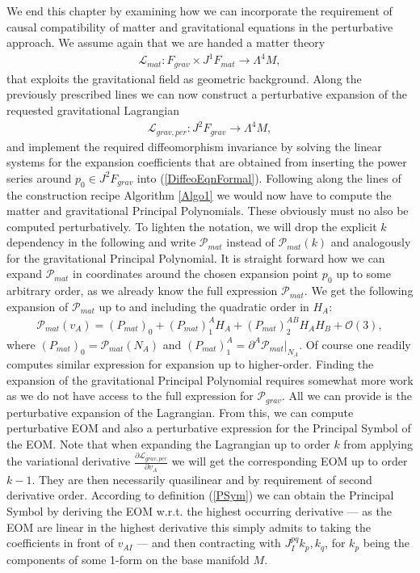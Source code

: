 \documentclass[a4paper,12pt, DIV=14, BCOR=5mm, twoside, headsepline, numbers=noenddot]{scrbook}
\begin{document}
We end this chapter by examining how we can incorporate the requirement of causal compatibility of matter and gravitational equations in the perturbative approach.
We assume again that we are handed a matter theory 
\begin{align}
    \mathcal{L}_{mat} : F_{grav} \times J^1F_{mat} \longrightarrow \Lambda^4M,
\end{align}
that exploits the gravitational field as geometric background. Along the previously prescribed lines we can now construct a perturbative expansion of the requested gravitational Lagrangian
\begin{align}
    \mathcal{L}_{grav,per} : J^2F_{grav} \longrightarrow \Lambda^4M,
\end{align}
and implement the required diffeomorphism invariance by solving the linear systems for the expansion coefficients that are obtained from inserting the power series around $p_0 \in J^2F_{grav}$ into (\ref{DiffeoEqnFormal}). 
Following along the lines of the construction recipe Algorithm \ref{Algo1} we would now have to compute the matter and gravitational Principal Polynomials.
These obviously must no also be computed perturbatively. 
To lighten the notation, we will drop the explicit $k$ dependency in the following and write $\mathcal{P}_{mat}$ instead of $\mathcal{P}_{mat}(k)$ and analogously for the gravitational Principal Polynomial. It is straight forward how we can expand $\mathcal{P}_{mat}$ in coordinates around the chosen expansion point $p_0$ up to some arbitrary order, as we already know the full expression $\mathcal{P}_{mat}$. We get the following expansion of $\mathcal{P}_{mat}$ up to and including the quadratic order in $H_A$:
\begin{align}
    \mathcal{P}_{mat}(v_A) = (P_{mat})_{0} + (P_{mat})^A_1 H_A+ (P_{mat})^{AB}_2 H_A H_B +\mathcal{O}(3),
\end{align}
where $(P_{mat})_0 = \mathcal{P}_{mat}(N_A)$ and $(P_{mat})_1^A = \partial^A \mathcal{P}_{mat} \vert _{N_A}$. Of course one readily computes similar expression for expansion up to higher-order. 
Finding the expansion of the gravitational Principal Polynomial requires somewhat more work as we do not have access to the full expression for $\mathcal{P}_{grav}$. All we can provide is the perturbative expansion of the Lagrangian. From this, we can compute perturbative EOM and also a perturbative expression for the Principal Symbol of the EOM.
Note that when expanding the Lagrangian up to order $k$ from applying the variational derivative $\frac{\partial\mathcal L_{grav,per}}{\partial v_A}$ we will get the corresponding EOM up to order $k-1$. They are then necessarily quasilinear and by requirement of second derivative order. According to definition (\ref{PSym}) we can obtain the Principal Symbol by deriving the EOM w.r.t. the highest occurring derivative  --- as the EOM are linear in the highest derivative this simply admits to taking the coefficients in front of $v_{AI}$ --- and then contracting with $J_I^{pq} k_p, k_q$, for $k_p$ being the components of some 1-form on the base manifold $M$. 
\end{document}
